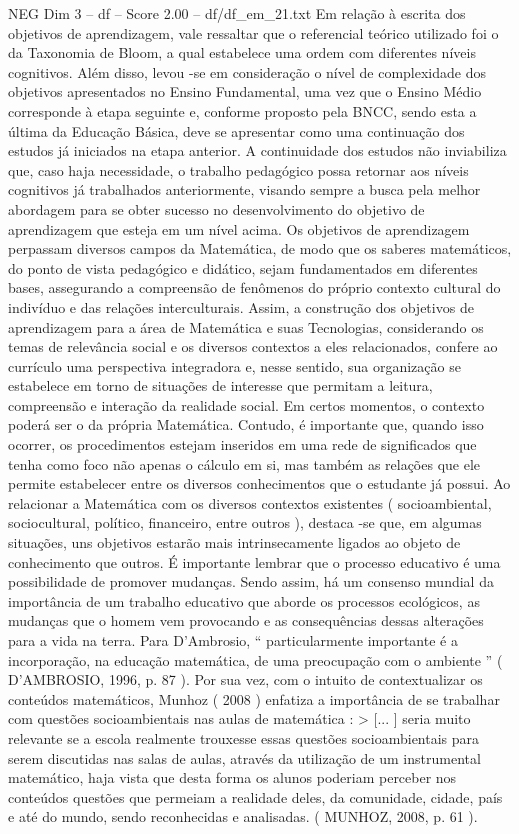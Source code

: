 \begin{textsample}{NEG Dim 3 – df – Score 2.00 – df/df\_em\_21.txt}
Em relação à escrita dos objetivos de aprendizagem, vale ressaltar que o referencial teórico utilizado foi o da Taxonomia de Bloom, a qual estabelece uma ordem com diferentes níveis cognitivos.
Além disso, levou -se em consideração o nível de complexidade dos objetivos apresentados no Ensino Fundamental, uma vez que o Ensino Médio corresponde à etapa seguinte e, conforme proposto pela BNCC, sendo esta a última da Educação Básica, deve se apresentar como uma continuação dos estudos já iniciados na etapa anterior.
A continuidade dos estudos não inviabiliza que, caso haja necessidade, o trabalho pedagógico possa retornar aos níveis cognitivos já trabalhados anteriormente, visando sempre a busca pela melhor abordagem para se obter sucesso no desenvolvimento do objetivo de aprendizagem que esteja em um nível acima.
Os objetivos de aprendizagem perpassam diversos campos da Matemática, de modo que os saberes matemáticos, do ponto de vista pedagógico e didático, sejam fundamentados em diferentes bases, assegurando a compreensão de fenômenos do próprio contexto cultural do indivíduo e das relações interculturais.
Assim, a construção dos objetivos de aprendizagem para a área de Matemática e suas Tecnologias, considerando os temas de relevância social e os diversos contextos a eles relacionados, confere ao currículo uma perspectiva integradora e, nesse sentido, sua organização se estabelece em torno de situações de interesse que permitam a leitura, compreensão e interação da realidade social.
Em certos momentos, o contexto poderá ser o da própria Matemática.
Contudo, é importante que, quando isso ocorrer, os procedimentos estejam inseridos em uma rede de significados que tenha como foco não apenas o cálculo em si, mas também as relações que ele permite estabelecer entre os diversos conhecimentos que o estudante já possui.
Ao relacionar a Matemática com os diversos contextos existentes ( socioambiental, sociocultural, político, financeiro, entre outros ), destaca -se que, em algumas situações, uns objetivos estarão mais intrinsecamente ligados ao objeto de conhecimento que outros.
É importante lembrar que o processo educativo é uma possibilidade de promover mudanças.
Sendo assim, há um consenso mundial da importância de um trabalho educativo que aborde os processos ecológicos, as mudanças que o homem vem provocando e as consequências dessas alterações para a vida na terra.
Para D’Ambrosio, “ particularmente importante é a incorporação, na educação matemática, de uma preocupação com o ambiente ” ( D’AMBROSIO, 1996, p. 87 ).
Por sua vez, com o intuito de contextualizar os conteúdos matemáticos, Munhoz ( 2008 ) enfatiza a importância de se trabalhar com questões socioambientais nas aulas de matemática : > [... ] seria muito relevante se a escola realmente trouxesse essas questões socioambientais para serem discutidas nas salas de aulas, através da utilização de um instrumental matemático, haja vista que desta forma os alunos poderiam perceber nos conteúdos questões que permeiam a realidade deles, da comunidade, cidade, país e até do mundo, sendo reconhecidas e analisadas. ( MUNHOZ, 2008, p. 61 ).

\end{textsample}
